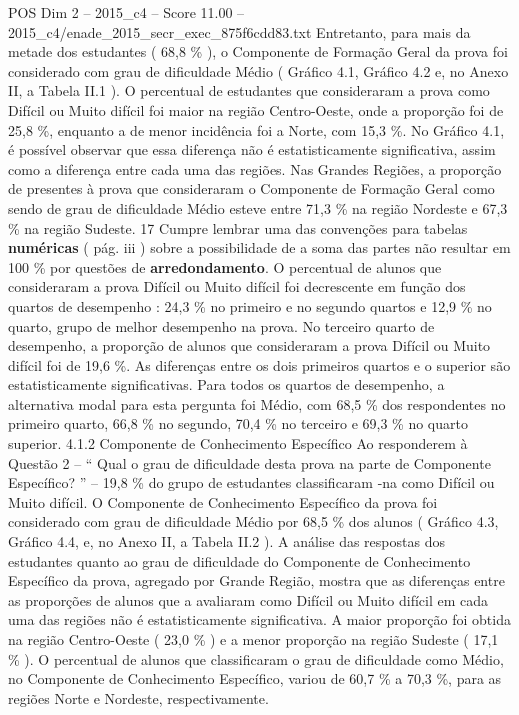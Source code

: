 \begin{textsample}{POS Dim 2 – 2015\_c4 – Score 11.00 – 2015\_c4/enade\_2015\_secr\_exec\_875f6cdd83.txt}
Entretanto, para mais da metade dos estudantes ( 68,8 \% ), o Componente de Formação Geral da prova foi considerado com grau de dificuldade Médio ( Gráfico 4.1, Gráfico 4.2 e, no Anexo II, a Tabela II.1 ).
O percentual de estudantes que consideraram a prova como Difícil ou Muito difícil foi maior na região Centro-Oeste, onde a proporção foi de 25,8 \%, enquanto a de menor incidência foi a Norte, com 15,3 \%.
No Gráfico 4.1, é possível observar que essa diferença não é estatisticamente significativa, assim como a diferença entre cada uma das regiões.
Nas Grandes Regiões, a proporção de presentes à prova que consideraram o Componente de Formação Geral como sendo de grau de dificuldade Médio esteve entre 71,3 \% na região Nordeste e 67,3 \% na região Sudeste. 17 Cumpre lembrar uma das convenções para tabelas \textbf{numéricas} ( pág. iii ) sobre a possibilidade de a soma das partes não resultar em 100 \% por questões de \textbf{arredondamento}.
O percentual de alunos que consideraram a prova Difícil ou Muito difícil foi decrescente em função dos quartos de desempenho : 24,3 \% no primeiro e no segundo quartos e 12,9 \% no quarto, grupo de melhor desempenho na prova.
No terceiro quarto de desempenho, a proporção de alunos que consideraram a prova Difícil ou Muito difícil foi de 19,6 \%.
As diferenças entre os dois primeiros quartos e o superior são estatisticamente significativas.
Para todos os quartos de desempenho, a alternativa modal para esta pergunta foi Médio, com 68,5 \% dos respondentes no primeiro quarto, 66,8 \% no segundo, 70,4 \% no terceiro e 69,3 \% no quarto superior. 4.1.2 Componente de Conhecimento Específico Ao responderem à Questão 2 – “ Qual o grau de dificuldade desta prova na parte de Componente Específico? ” – 19,8 \% do grupo de estudantes classificaram -na como Difícil ou Muito difícil.
O Componente de Conhecimento Específico da prova foi considerado com grau de dificuldade Médio por 68,5 \% dos alunos ( Gráfico 4.3, Gráfico 4.4, e, no Anexo II, a Tabela II.2 ).
A análise das respostas dos estudantes quanto ao grau de dificuldade do Componente de Conhecimento Específico da prova, agregado por Grande Região, mostra que as diferenças entre as proporções de alunos que a avaliaram como Difícil ou Muito difícil em cada uma das regiões não é estatisticamente significativa.
A maior proporção foi obtida na região Centro-Oeste ( 23,0 \% ) e a menor proporção na região Sudeste ( 17,1 \% ).
O percentual de alunos que classificaram o grau de dificuldade como Médio, no Componente de Conhecimento Específico, variou de 60,7 \% a 70,3 \%, para as regiões Norte e Nordeste, respectivamente.

\end{textsample}
